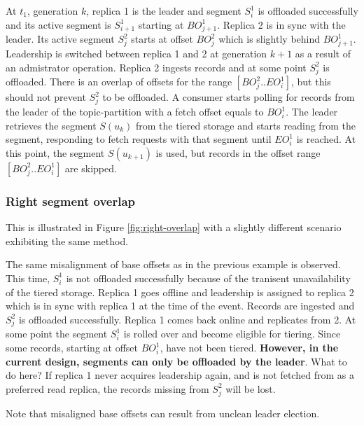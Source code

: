 \documentclass{article}
\begin{document}
\begin{outline}[enumerate]
	\1 At $t_1$, generation $k$, replica 1 is the leader and segment $S_i^1$ is offloaded successfully and its active segment is $S_{i+1}^1$ starting at $BO_{j+1}^1$. Replica 2 is in sync with the leader. Its active segment $S_j^2$ starts at offset $BO_j^2$ which is slightly behind $BO_{j+1}^1$. 
	\1 Leadership is switched between replica 1 and 2 at generation $k+1$ as a result of an admistrator operation. Replica 2 ingests records and at some point $S_j^2$ is offloaded. There is an overlap of offsets for the range $[BO_j^2..EO_i^1]$, but this should not prevent $S_j^2$ to be offloaded.
	\1 A consumer starts polling for records from the leader of the topic-partition with a fetch offset equals to $BO_i^1$. The leader retrieves the segment $S(u_k)$ from the tiered storage and starts reading from the segment, responding to fetch requests with that segment until $EO_i^1$ is reached. At this point, the segment $S(u_{k+1})$ is used, but records in the offset range $[BO_j^2..EO_i^1]$ are skipped. 
\end{outline}

\subsubsection{Right segment overlap}

This is illustrated in Figure \ref{fig:right-overlap} with a slightly different scenario exhibiting the same method.

\begin{outline}[enumerate]
	\1 The same misalignment of base offsets as in the previous example is observed. This time, $S_i^1$ is not offloaded successfully because of the tranisent unavailability of the tiered storage.
	\1 Replica 1 goes offline and leadership is assigned to replica 2 which is in sync with replica 1 at the time of the event. Records are ingested and $S_j^2$ is offloaded successfully.
	\1 Replica 1 comes back online and replicates from 2. At some point the segment $S_i^1$ is rolled over and become eligible for tiering. Since some records, starting at offset $BO_i^1$, have not been tiered. \textbf{However, in the current design, segments can only be offloaded by the leader}. What to do here? If replica 1 never acquires leadership again, and is not fetched from as a preferred read replica, the records missing from $S_j^2$ will be lost.
\end{outline}

Note that misaligned base offsets can result from unclean leader election.
\end{document}
